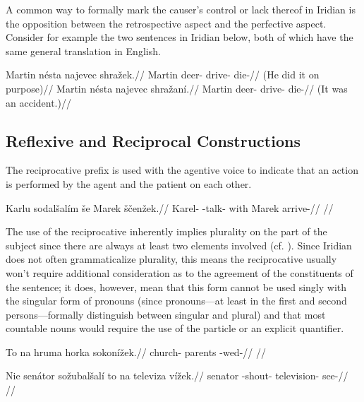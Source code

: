A common way to formally mark the causer's control or lack thereof in Iridian is the opposition between the retrospective aspect and the perfective aspect. Consider for example the two sentences in Iridian below, both of which have the same general translation in English.

\pex
\a
\begingl
	\gla Martin n\'esta najevec shra\v{z}ek.//
	\glb Martin deer- drive- die-//
	\glft {} (He did it on purpose)//
\endgl
\a
\begingl
	\gla Martin n\'esta najevec shra\v{z}an\'i.//
	\glb Martin deer- drive- die-//
	\glft {} (It was an accident.)//
\endgl
\xe

\subsection{Reflexive and Reciprocal Constructions}

The reciprocative prefix  is used with the agentive voice to indicate that an action is performed by the agent and the patient on each other.

\pex
\begingl
\gla Karlu sodal\v{s}al\'im \v{s}e Marek \v{s}\v{c}en\v{z}ek.//
\glb Karel- -talk- with Marek arrive-//
\glft {}//
\endgl
\xe

The use of the reciprocative inherently implies plurality on the part of the subject since there are always at least two elements involved (cf. \cite[255]{tesniere1965}). Since Iridian does not often grammaticalize plurality, this means the reciprocative usually won't require additional consideration as to the agreement of the constituents of the sentence; it does, however, mean that this form cannot be used singly with the singular form of pronouns (since pronouns---at least in the first and second persons---formally distinguish between singular and plural) and that most countable nouns would require the use of the particle  or an explicit quantifier.

\pex
\begingl
\gla To na hruma horka sokon\'i\v{z}ek.//
\glb {}  church- parents -wed-//
\glft {}//
\endgl
\xe

\pex
\begingl
\gla Nie sen\'ator so\v{z}ubal\v{s}al\'i to na televiza v\'i\v{z}ek.//
\glb {} senator -shout-   television- see-//
\glft {}//
\endgl
\xe

